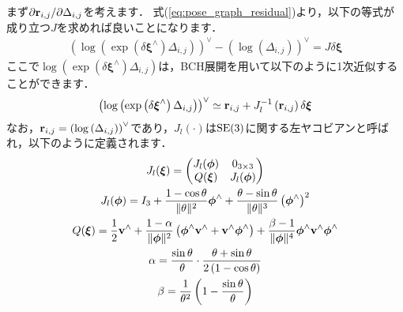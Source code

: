 まず$\partial {\bf r}_{i, j} / \partial \Delta_{i, j}$を考えます．
式(\ref{eq:pose_graph_residual})より，以下の等式が成り立つ$J$を求めれば良いことになります．
%
\begin{align}
  \left( \log \left( \exp \left( \delta \boldsymbol \xi^{\wedge} \right) \Delta_{i, j} \right) \right)^{\vee} - \left( \log \left( \Delta_{i, j} \right) \right)^{\vee} = J \delta \boldsymbol \xi
  \label{eq:deij_dDeltaij_J_deltaxi}
\end{align}
%
ここで$\log \left( \exp \left( \delta \boldsymbol \xi^{\wedge} \right) \Delta_{i, j} \right)$は，BCH展開を用いて以下のように1次近似することができます．
%
\begin{align}
  \left( \log \left( \exp \left( \delta \boldsymbol \xi^{\wedge} \right) \Delta_{i, j} \right) \right)^{\vee}
  \simeq {\bf r}_{i, j} + J_{l}^{-1} \left( {\bf r}_{i, j} \right) \delta \boldsymbol \xi
  \label{eq:bch_1_order_approx}
\end{align}
%
なお，${\bf r}_{i, j} = \left( \log \left( \Delta_{i, j} \right) \right)^{\vee}$であり，$J_{l}( \cdot )$は${\rm SE}(3)$に関する左ヤコビアンと呼ばれ，以下のように定義されます．
%
\begin{align}
  \begin{gathered}
    J_{l}( \boldsymbol \xi )
    = \left( \begin{matrix}
        J_{l}( \boldsymbol \phi ) & 0_{3 \times 3} \\
        Q( \boldsymbol \xi )      & J_{l}( \boldsymbol \phi ) \\
      \end{matrix} \right) \\
%
    J_{l}( \boldsymbol \phi ) = I_{3}
                              + \frac{ 1 - \cos \theta }{ \| \theta \|^{2} } \boldsymbol \phi^{\wedge}
                              + \frac{ \theta - \sin \theta }{ \| \theta \|^{3} } \left( \boldsymbol \phi^{\wedge} \right)^{2} \\
%
    Q( \boldsymbol \xi ) = \frac{1}{2} {\bf v}^{\wedge}
                         + \frac{1 - \alpha}{ \|\boldsymbol \phi \|^{2} } \left( \boldsymbol \phi^{\wedge} {\bf v}^{\wedge} + {\bf v}^{\wedge} \boldsymbol \phi^{\wedge} \right)
                         + \frac{\beta - 1}{ \|\boldsymbol \phi \|^{4} } \boldsymbol \phi^{\wedge} {\bf v}^{\wedge} \boldsymbol \phi^{\wedge} \\
%
    \alpha = \frac{ \sin \theta }{ \theta } \cdot \frac{ \theta + \sin \theta }{ 2 \left( 1 - \cos \theta \right) } \\
%
    \beta = \frac{1}{ \theta^{2} } \left( 1 - \frac{ \sin \theta }{ \theta } \right)
  \end{gathered}
  \label{eq:left_jacobian_se3}
\end{align}

